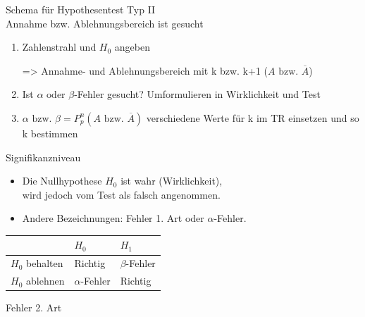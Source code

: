 \documentclass[paper=a6,ngerman,twoside=true,fontsize=14pt, parskip = half]{scrartcl}
\begin{document}
\begin{frage}
	Schema für Hypothesentest Typ II\\
	Annahme bzw. Ablehnungsbereich ist gesucht
	
\end{frage}
\begin{antwort}
	\begin{enumerate}
		\item Zahlenstrahl und $H_0$ angeben
		
		=> Annahme- und Ablehnungsbereich mit k bzw. k+1 ($A \text{ bzw. }\overline{A}$)	
		\item Ist  $\alpha \text{ oder }\beta$-Fehler gesucht? Umformulieren in Wirklichkeit und Test
		\item $\alpha \text{ bzw. }\beta=P^n_p(A\text{ bzw. }\overline{A})$ verschiedene Werte für k im TR einsetzen und so k bestimmen
	\end{enumerate}
	
\end{antwort}	
\begin{frage}
	Signifikanzniveau
	
\end{frage}
\begin{antwort}
	\begin{itemize}
		\item Die Nullhypothese $H_0$ ist wahr (Wirklichkeit), \\
		 wird jedoch vom Test als falsch angenommen.
		\item Andere Bezeichnungen: Fehler 1. Art oder $\alpha$-Fehler.	
	\end{itemize}
	\begin{center}
		\begin{tabularx}{\textwidth}{|>{\centering\arraybackslash}X|>{\centering\arraybackslash}X|>{\centering\arraybackslash}X|}
			\hline
			\diagbox{Test}{Wirkl.} & $H_0$ & $H_1$ \\ \hline
			$H_0$ behalten & Richtig & $\beta$-Fehler \\ \hline
			$H_0$ ablehnen & $\alpha$-Fehler & Richtig \\ \hline
		\end{tabularx}
	\end{center}
\end{antwort}
\begin{frage}
	Fehler 2. Art
	
\end{frage}
\end{document}
